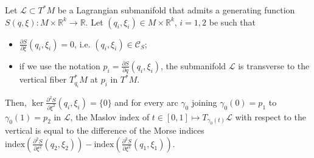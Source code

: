 \documentclass[AHL, Unicode, longabstracts, published]{cedram}
\newcommand*\cC{\mathcal{C}}
\newcommand*\cl{\mathcal{L}}
\newcommand*\R{\mathbb{R}}
\begin{document}
\begin{theo}\label{Tmain}
Let $\cl\subset T^*M$ be a Lagrangian submanifold that admits a generating function $S(q, \xi):M\times \R^k\rightarrow \R$. Let $(q_i, \xi_i)\in M\times \R^k$, $i= 1, 2$ be such that
\begin{itemize}
\item $\frac{\partial S}{\partial \xi}(q_i, \xi_i)=0$, i.e. $(q_i,\xi_i)\in \cC_S$;
\item if we use the notation $p_i= \frac{\partial S}{\partial q}(q_i, \xi_i)$, the submanifold $\cl$ is transverse to the vertical fiber $T^*_{q_i}M$ at $p_i$ in $T^*M$.
\end{itemize}
Then, $\ker \frac{\partial^2 S}{\partial \xi^2}(q_i, \xi_i)=\{ 0\}$ and for every arc $\gamma_0$ joining $\gamma_0(0)=p_1$ to $\gamma_0 (1)=p_2$ in $\cl$, the Maslov index of $t\in [0, 1]\mapsto T_{\gamma_0 (t)}\cl$ with respect to the vertical is equal to the difference of the Morse indices $\text{index}(\frac{\partial^2 S}{\partial \xi^2}(q_2, \xi_2))-\text{index}(\frac{\partial^2 S}{\partial \xi^2}(q_1, \xi_1))$.
\end{theo}
\end{document}
